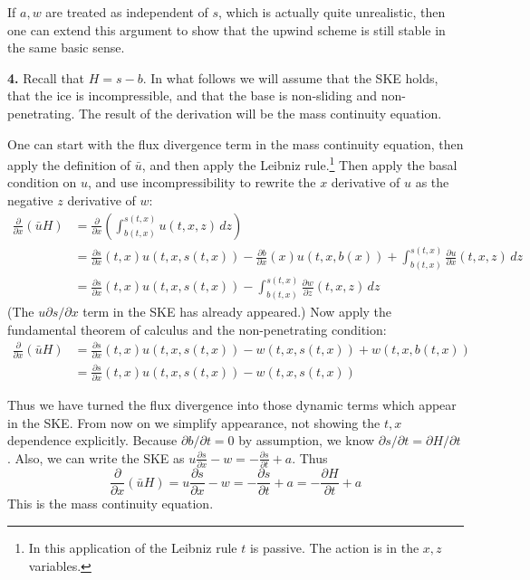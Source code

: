 \documentclass[12pt]{amsart}
\newcommand{\prob}[1]{\bigskip\noindent\textbf{#1.}\quad }
\begin{document}
If $a,w$ are treated as independent of $s$, which is actually quite unrealistic, then one can extend this argument to show that the upwind scheme is still stable in the same basic sense.


\prob{4}  Recall that $H=s-b$.  In what follows we will assume that the SKE holds, that the ice is incompressible, and that the base is non-sliding and non-penetrating.  The result of the derivation will be the mass continuity equation.

One can start with the flux divergence term in the mass continuity equation, then apply the definition of $\bar u$, and then apply the Leibniz rule.\footnote{In this application of the Leibniz rule $t$ is passive.  The action is in the $x,z$ variables.}  Then apply the basal condition on $u$, and use incompressibility to rewrite the $x$ derivative of $u$ as the negative $z$ derivative of $w$:
\begin{align*}
\frac{\partial}{\partial x}(\bar u H) &= \frac{\partial}{\partial x}\left(\int_{b(t,x)}^{s(t,x)} u(t,x,z)\,dz\right) \\
   &= \frac{\partial s}{\partial x}(t,x) u(t,x,s(t,x)) - \frac{\partial b}{\partial x}(x) u(t,x,b(x)) + \int_{b(t,x)}^{s(t,x)} \frac{\partial u}{\partial x}(t,x,z)\,dz \\
   &= \frac{\partial s}{\partial x}(t,x) u(t,x,s(t,x)) - \int_{b(t,x)}^{s(t,x)} \frac{\partial w}{\partial z}(t,x,z)\,dz
\end{align*}
(The $u \partial s/\partial x$ term in the SKE has already appeared.)  Now apply the fundamental theorem of calculus and the non-penetrating condition:
\begin{align*}
\frac{\partial}{\partial x}(\bar u H) &= \frac{\partial s}{\partial x}(t,x) u(t,x,s(t,x)) - w(t,x,s(t,x)) + w(t,x,b(t,x)) \\
  &= \frac{\partial s}{\partial x}(t,x) u(t,x,s(t,x)) - w(t,x,s(t,x))
\end{align*}

Thus we have turned the flux divergence into those dynamic terms which appear in the SKE.  From now on we simplify appearance, not showing the $t,x$ dependence explicitly.  Because $\partial b/\partial t=0$ by assumption, we know $\partial s/\partial t = \partial H/\partial t$.  Also, we can write the SKE as $u \frac{\partial s}{\partial x} - w = -\frac{\partial s}{\partial t} + a$.  Thus
	$$\frac{\partial}{\partial x}(\bar u H) = u \frac{\partial s}{\partial x} - w = -\frac{\partial s}{\partial t} + a = -\frac{\partial H}{\partial t} + a$$
This is the mass continuity equation.
\end{document}
